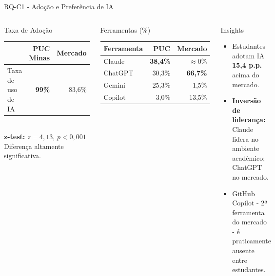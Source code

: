 \documentclass[fleqn]{beamer}
\begin{document}
\begin{frame}{RQ-C1 - Adoção e Preferência de IA}
\begin{columns}[T]
\begin{block}{Taxa de Adoção}
\scriptsize
\begin{tabular}{lrr}
\toprule
 & \textbf{PUC Minas} & \textbf{Mercado} \\
\midrule
Taxa de uso de IA & \textbf{99\%} & 83,6\% \\
\bottomrule
\end{tabular}\\[0.3cm]
\textbf{z-test:} $z = 4{,}13$, $p < 0{,}001$\\
Diferença altamente significativa.
\end{block}

\begin{block}{Ferramentas (\%)}
\scriptsize
\begin{tabular}{lrr}
\toprule
\textbf{Ferramenta} & \textbf{PUC} & \textbf{Mercado} \\
\midrule
Claude & \textbf{38,4\%} & $\approx$0\% \\
ChatGPT & 30,3\% & \textbf{66,7\%} \\
Gemini & 25,3\% & 1,5\% \\
Copilot & 3,0\% & 13,5\% \\
\bottomrule
\end{tabular}
\end{block}

\begin{alertblock}{Insights}
\begin{itemize}
    \item Estudantes adotam IA \textbf{15,4 p.p.} acima do mercado.
    \item \textbf{Inversão de liderança:} Claude lidera no ambiente acadêmico; ChatGPT no mercado.
    \item GitHub Copilot - 2ª ferramenta do mercado - é praticamente ausente entre estudantes.
\end{itemize}
\end{alertblock}
\end{columns}
\end{frame}
\end{document}
